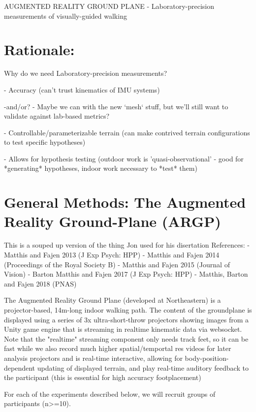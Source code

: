 AUGMENTED REALITY GROUND PLANE - Laboratory-precision measurements of
visually-guided walking

\section{Rationale:}

Why do we need Laboratory-precision measurements?

- Accuracy (can't trust kinematics of IMU systems)

    -and/or? - Maybe we can with the new `mesh` stuff, but we'll still want to validate against lab-based metrics?

- Controllable/parameterizable terrain (can make contrived terrain configurations to test specific hypotheses)

- Allows for hypothesis testing (outdoor work is 'quasi-observational' - good for *generating* hypotheses, indoor work necessary to *test* them)


\section{General Methods: The Augmented Reality Ground-Plane (ARGP)}

This is a souped up version of the thing Jon used for his disertation
References:
  - Matthis and Fajen 2013 (J Exp Psych: HPP)
  - Matthis and Fajen 2014 (Proceedings of the Royal Society B)
  - Matthis and Fajen 2015 (Journal of Vision)
  - Barton Matthis and Fajen 2017 (J Exp Psych: HPP)
  - Matthis, Barton and Fajen 2018 (PNAS)


The Augmented Reality Ground Plane (developed at Northeastern) is a projector-based, 14m-long indoor walking path. The content of the groundplane is displayed using a series of 3x ultra-short-throw projectors showing images from a Unity game engine that is streaming in realtime kinematic data via websocket. Note that the "realtime" streaming component only needs track feet, so it can be fast while we also record much higher spatial/temportal res videos for later analysis projectors and is real-time interactive, allowing for body-position-dependent updating of displayed terrain, and play real-time auditory feedback to the participant (this is essential for high accuracy footplacement)


For each of the experiments described below, we will recruit groups of participants (n\textgreater=10). 

